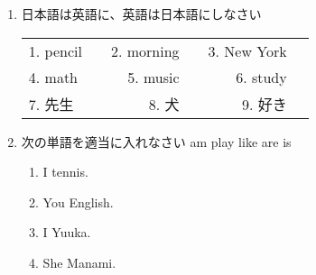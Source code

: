 \documentclass[fleqn]{jsarticle}
\begin{document}
\begin{enumerate}
  \item 日本語は英語に、英語は日本語にしなさい 
    \begin{table}[htb]
      \begin{tabular}{lcrrrr}
        1. pencil & \underline{\hspace{4zw}} & 2. morning & \underline{\hspace{3zw}} & 3. New York & \underline{\hspace{4zw}} \\
        4. math & \underline{\hspace{4zw}} & 5. music & \underline{\hspace{3zw}} & 6. study & \underline{\hspace{4zw}} \\
        7. 先生 & \underline{\hspace{4zw}} & 8. 犬 & \underline{\hspace{3zw}} & 9. 好き & \underline{\hspace{4zw}} \\
      \end{tabular}
    \end{table}
  \item 次の単語を適当に入れなさい
    am play like are is
    \begin{enumerate}
      \item I \underline{\hspace{4zw}} tennis.
      \item You \underline{\hspace{4zw}} English.
      \item I \underline{\hspace{4zw}} Yuuka.
      \item She \underline{\hspace{4zw}} Manami.
    \end{enumerate}


\end{enumerate}
\end{document}
